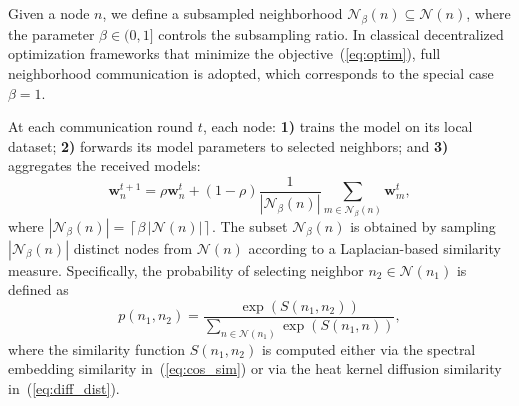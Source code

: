 \documentclass[journal]{IEEEtran}
\begin{document}


Given a node $n$, we define a subsampled neighborhood $\mathcal{N}_{\beta}(n) \subseteq \mathcal{N}(n)$, where the parameter $\beta \in (0,1]$ controls the subsampling ratio. In classical decentralized optimization frameworks that minimize the objective~(\ref{eq:optim}), full neighborhood communication is adopted, which corresponds to the special case $\beta = 1$.  

At each communication round $t$, each node: \textbf{1)} trains the model on its local dataset; \textbf{2)} forwards its model parameters to selected neighbors; and \textbf{3)} aggregates the received models:
\begin{equation} \label{eq:aggreg}
    \boldsymbol{w}_n^{t+1} = \rho \boldsymbol{w}_n^{t} + (1 - \rho)\frac{1}{|\mathcal{N}_{\beta}(n)|}\sum_{m \in \mathcal{N}_{\beta}(n)} \boldsymbol{w}_m^{t},
\end{equation}
where $|\mathcal{N}_{\beta}(n)| = \left\lceil \beta\,|\mathcal{N}(n)| \right\rceil$. The subset $\mathcal{N}_{\beta}(n)$ is obtained by sampling $|\mathcal{N}_{\beta}(n)|$ distinct nodes from $\mathcal{N}(n)$ according to a Laplacian-based similarity measure. Specifically, the probability of selecting neighbor $n_2 \in \mathcal{N}(n_1)$ is defined as
\begin{equation} \label{eq:proba}
    p(n_1, n_2) = \frac{\exp\!\left(S(n_1, n_2)\right)}{\sum_{n \in \mathcal{N}(n_1)} \exp\!\left(S(n_1, n)\right)},
\end{equation}
where the similarity function $S(n_1,n_2)$ is computed either via the spectral embedding similarity in~(\ref{eq:cos_sim}) or via the heat kernel diffusion similarity in~(\ref{eq:diff_dist}).
\end{document}
